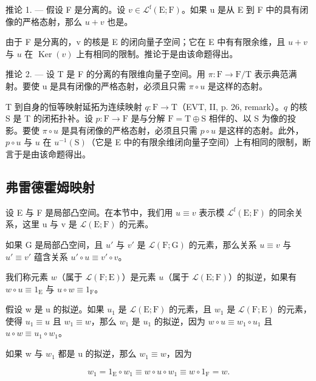 推论 1. --- 假设 F 是分离的。设 \(v \in \mathcal{L}^{\mathrm{f}}(\mathrm{E};\mathrm{F})\)。如果 u 是从 E 到 F 中的具有闭像的严格态射，那么 \(u + v\) 也是。

由于 F 是分离的，v 的核是 E 的闭向量子空间；它在 E 中有有限余维，且 \(u + v\) 与 \(u\) 在 \(\operatorname{Ker}(v)\) 上有相同的限制。推论于是由该命题得出。

推论 2. --- 设 T 是 F 的分离的有限维向量子空间。用 \(\pi\colon\mathrm{F}\to\mathrm{F}/\mathrm{T}\) 表示典范满射。要使 u 是具有闭像的严格态射，必须且只需 \(\pi\circ u\) 是这样的态射。

T 到自身的恒等映射延拓为连续映射 \(q \colon \mathrm{F} \to \mathrm{T}\)（EVT, II, p. 26, remark）。\(q\) 的核 S 是 T 的闭拓扑补。设 \(p \colon \mathrm{F} \to \mathrm{F}\) 是与分解 \(\mathrm{F} = \mathrm{T} \oplus \mathrm{S}\) 相伴的、以 S 为像的投影。要使 \(\pi \circ u\) 是具有闭像的严格态射，必须且只需 \(p \circ u\) 是这样的态射。此外，\(p \circ u\) 与 \(u\) 在 \(u^{-1}(\mathrm{S})\)（它是 E 中的有限余维闭向量子空间）上有相同的限制，断言于是由该命题得出。

\subsection{弗雷德霍姆映射}

设 E 与 F 是局部凸空间。在本节中，我们用 \(u \equiv v\) 表示模 \(\mathcal{L}^{\mathrm{f}}(\mathrm{E};\mathrm{F})\) 的同余关系，这里 u 与 v 是 \(\mathcal{L}(\mathrm{E};\mathrm{F})\) 的元素。

如果 G 是局部凸空间，且 \(u'\) 与 \(v'\) 是 \(\mathcal{L}(\mathrm{F};\mathrm{G})\) 的元素，那么关系 \(u \equiv v\) 与 \(u' \equiv v'\) 蕴含关系 \(u' \circ u \equiv v' \circ v\)。

我们称元素 \(w\)（属于 \(\mathcal{L}(\mathrm{F};\mathrm{E})\)）是元素 \(u\)（属于 \(\mathcal{L}(\mathrm{E};\mathrm{F})\)）的拟逆，如果有 \(w \circ u \equiv 1_{\mathrm{E}}\) 与 \(u \circ w \equiv 1_{\mathrm{F}}\)。

假设 w 是 u 的拟逆。如果 \(u_{1}\) 是 \(\mathcal{L}(\mathrm{E};\mathrm{F})\) 的元素，且 \(w_{1}\) 是 \(\mathcal{L}(\mathrm{F};\mathrm{E})\) 的元素，使得 \(u_{1} \equiv u\) 且 \(w_{1} \equiv w\)，那么 \(w_{1}\) 是 \(u_{1}\) 的拟逆，因为 \(w \circ u \equiv w_{1} \circ u_{1}\) 且 \(u \circ w \equiv u_{1} \circ w_{1}\)。

如果 w 与 \(w_{1}\) 都是 u 的拟逆，那么 \(w_{1} \equiv w\)，因为

\[
w _ {1} = 1 _ {\mathrm{E}} \circ w _ {1} \equiv w \circ u \circ w _ {1} \equiv w \circ 1 _ {\mathrm{F}} = w.
\]

